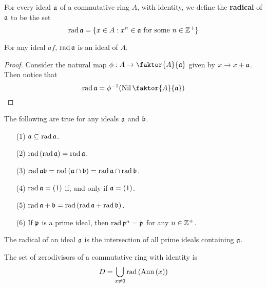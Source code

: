 \begin{definition}
    For every ideal $\af$ of a commutative ring $A$, with identity, we define
    the \textbf{radical} of $\af$ to be the set
    \begin{equation*}
        \rad{\af}=\{x \in A : x^n \in \af \text{ for some } n \in \Z^+\}
    \end{equation*}
\end{definition}

\begin{lemma}\label{1.6.10}
    For any ideal $af$, $\rad{\af}$ is an ideal of $A$.
\end{lemma}
\begin{proof}
    Consider the natural map $\phi:A \xrightarrow{} \faktor{A}{\af}$ given by $x
    \xrightarrow{} x+\af$. Then notice that
    \begin{equation*}
        \rad{\af}=\inv{\phi}(\Nil{\faktor{A}{\af}})
    \end{equation*}
\end{proof}

\begin{lemma}\label{1.6.11}
    The following are true for any ideals $\af$ and  $\bf$.
    \begin{enumerate}
        \item[(1)] $\af \subseteq \rad{\af}$.

        \item[(2)] $\rad{(\rad{\af})}=\rad{\af}$.

        \item[(3)] $\rad{\af\bf}=\rad{(\af \cap \bf)}=\rad{\af} \cap \rad{\bf}$.

        \item[(4)] $\rad{\af}=(1)$ if, and only if $\af=(1)$.

        \item[(5)] $\rad{\af+\bf}=\rad{(\rad{\af}+\rad{\bf})}$.

        \item[(6)] If $\pf$ is a prime ideal, then  $\rad{\pf^n}=\pf$ for any $n
            \in \Z^+$.
    \end{enumerate}
\end{lemma}

\begin{lemma}\label{1.6.12}
    The radical of an ideal $\af$ is the intersection of all prime ideals
    containing  $\af$.
\end{lemma}

\begin{lemma}\label{1.6.13}
    The set of zerodivisors of a commutative ring with identity is
    \begin{equation*}
        D=\bigcup_{x \neq 0}{\rad{(\Ann{(x)})}}
    \end{equation*}
\end{lemma}

